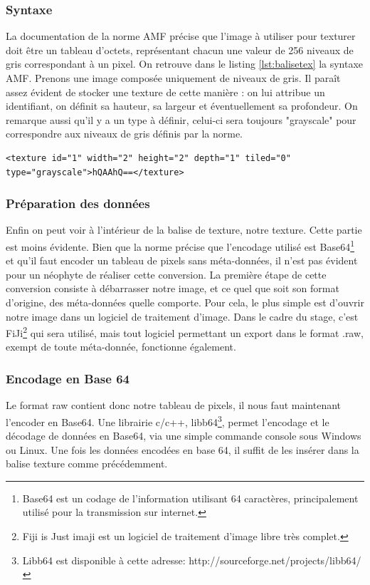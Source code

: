 \documentclass{tnreport}
\begin{document}
\subsubsection{Syntaxe}
La documentation de la norme AMF\cite{astmAMF} précise que l'image à utiliser pour texturer doit être un tableau d'octets, représentant chacun une valeur de 256 niveaux de gris correspondant à un pixel. On retrouve dans le listing \ref{lst:balisetex} la syntaxe AMF. 
Prenons une image composée uniquement de niveaux de gris. Il paraît assez évident de stocker une texture de cette manière : on lui attribue un identifiant, on définit sa hauteur, sa largeur et éventuellement sa profondeur. On remarque aussi qu'il y a un type à définir, celui-ci sera toujours "grayscale" pour correspondre aux niveaux de gris définis par la norme. 
\begin{lstlisting}[language=AMF, caption={syntaxe balise texture}, label={lst:balisetex}]
<texture id="1" width="2" height="2" depth="1" tiled="0" type="grayscale">hQAAhQ==</texture>
\end{lstlisting}

\subsubsection{Préparation des données}
Enfin on peut voir à l'intérieur de la balise de texture, notre texture. Cette partie est moins évidente. Bien que la norme précise que l'encodage utilisé est Base64\footnote{Base64 est un codage de l'information utilisant 64 caractères, principalement utilisé pour la transmission sur internet.} et qu'il faut encoder un tableau de pixels sans méta-données, il n'est pas évident pour un néophyte de réaliser cette conversion. La première étape de cette conversion consiste à débarrasser notre image, et ce quel que soit son format d'origine, des méta-données quelle comporte. Pour cela, le plus simple est d'ouvrir notre image dans un logiciel de traitement d'image. Dans le cadre du stage, c'est FiJi\footnote{Fiji is Just imaji est un logiciel de traitement d'image libre très complet.} qui sera utilisé, mais tout logiciel permettant un export dans le format .raw, exempt de toute méta-donnée, fonctionne également. 

\subsubsection{Encodage en Base 64}
Le format raw contient donc notre tableau de pixels, il nous faut maintenant l'encoder en Base64. Une librairie c/c++, libb64\footnote{Libb64 est disponible à cette adresse: http://sourceforge.net/projects/libb64/}, permet l'encodage et le décodage de données en Base64, via une simple commande console sous Windows ou Linux. Une fois les données encodées en base 64, il suffit de les insérer dans la balise texture comme précédemment. 
\end{document}
